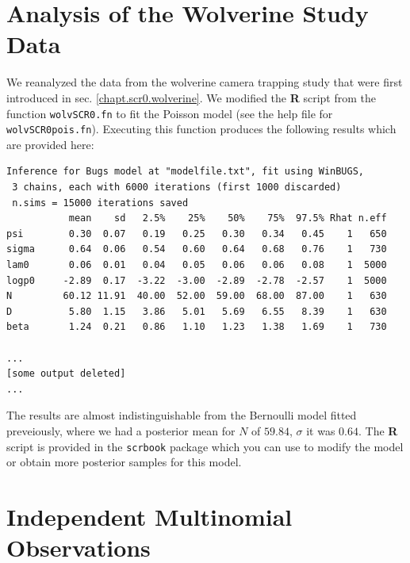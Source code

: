 \section{Analysis of the Wolverine Study Data}

We reanalyzed the data from
the  wolverine camera trapping study that were first introduced in 
sec. \ref{chapt.scr0.wolverine}.
We modified the {\bf R} script from the function \mbox{\tt wolvSCR0.fn} to fit the
Poisson model (see the help file for \mbox{\tt
  wolvSCR0pois.fn}). Executing this function produces the following
results which are provided here:
{\small
\begin{verbatim}
Inference for Bugs model at "modelfile.txt", fit using WinBUGS,
 3 chains, each with 6000 iterations (first 1000 discarded)
 n.sims = 15000 iterations saved
           mean    sd   2.5%    25%    50%    75%  97.5% Rhat n.eff
psi        0.30  0.07   0.19   0.25   0.30   0.34   0.45    1   650
sigma      0.64  0.06   0.54   0.60   0.64   0.68   0.76    1   730
lam0       0.06  0.01   0.04   0.05   0.06   0.06   0.08    1  5000
logp0     -2.89  0.17  -3.22  -3.00  -2.89  -2.78  -2.57    1  5000
N         60.12 11.91  40.00  52.00  59.00  68.00  87.00    1   630
D          5.80  1.15   3.86   5.01   5.69   6.55   8.39    1   630
beta       1.24  0.21   0.86   1.10   1.23   1.38   1.69    1   730

...
[some output deleted]
...
\end{verbatim}
}
The results are almost indistinguishable from the Bernoulli model
fitted preveiously, where we had a posterior mean for $N$ of
 $59.84$,  $\sigma$ it was
$0.64$. The {\bf R} 
script is provided in the  \mbox{\tt scrbook} package which you can
use to modify the model or obtain more posterior samples for this model.




\section{Independent Multinomial Observations}

